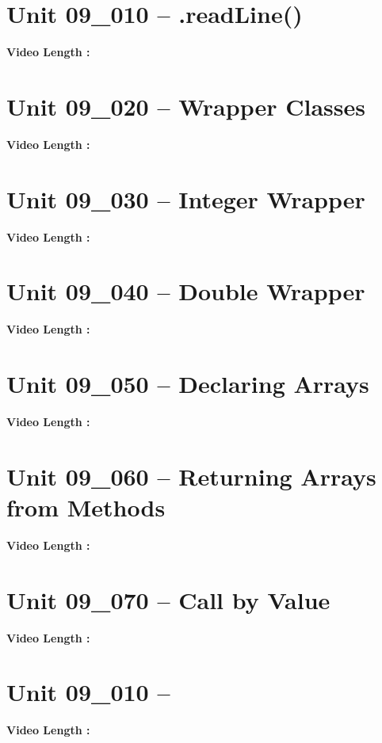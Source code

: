 \documentclass[letterpaper,12pt]{exam}
\newcommand{\unit}{Unit 09}
\begin{document}
\section*{\unit\_010 -- .readLine() } %
\par{\selectfont\textbf{Video Length :}}

\section*{\unit\_020 -- Wrapper Classes } %
\par{\selectfont\textbf{Video Length :}}

\section*{\unit\_030 -- Integer Wrapper} %
\par{\selectfont\textbf{Video Length :}}

\section*{\unit\_040 -- Double Wrapper } %
\par{\selectfont\textbf{Video Length :}}

\section*{\unit\_050 -- Declaring Arrays} %
\par{\selectfont\textbf{Video Length :}}

\section*{\unit\_060 -- Returning Arrays from Methods} %
\par{\selectfont\textbf{Video Length :}}

\section*{\unit\_070 -- Call by Value } %
\par{\selectfont\textbf{Video Length :}}

\section*{\unit\_010 -- } %
\par{\selectfont\textbf{Video Length :}}
\end{document}
